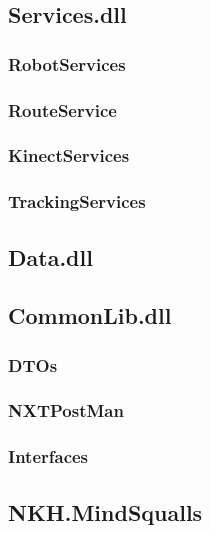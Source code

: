 \subsection{Services.dll}\label{arkitektur:services}
\subsubsection{RobotServices}
\subsubsection{RouteService}
\subsubsection{KinectServices}
\subsubsection{TrackingServices}


\subsection{Data.dll}\label{arkitektur:data}


\subsection{CommonLib.dll}\label{arkitektur:commonlib}
\subsubsection{DTOs}
\subsubsection{NXTPostMan}
\subsubsection{Interfaces}

\subsection{NKH.MindSqualls}\label{arkitektur:mindsqualls}


